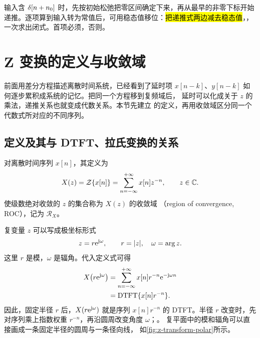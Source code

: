 \begin{technique}
  输入含 $\delta[n+n_0]$ 时，先按初始松弛把零区间确定下来，再从最早的非零下标开始递推。逐项算到输入转为常值后，可用稳态值移位：\hl{把递推式两边减去稳态值}，，一次求出闭式。首项必须，否则。
\end{technique}

\section{Z 变换的定义与收敛域}
\label{sec:z-transform-definition}

前面用差分方程描述离散时间系统，已经看到了延时项
$x[n-k]$、$y[n-k]$ 如何逐步累积成系统的记忆。把同一个方程移到复频域后，
延时可以化成关于 $z$ 的乘法，递推关系也就变成代数关系。本节先建立
的定义，再用收敛域区分同一个代数式所对应的不同序列。

\subsection{定义及其与 DTFT、拉氏变换的关系}
\label{subsec:z-transform-definition}

\begin{definition}[双边 Z 变换]
  对离散时间序列 $x[n]$，其定义为
  \begin{equation}
    X(z)=\mathcal{Z}\{x[n]\}
    =\sum_{n=-\infty}^{+\infty}x[n]z^{-n},
    \qquad z\in\mathbb{C}.
    \label{eq:z-transform-definition}
  \end{equation}
  使级数绝对收敛的 $z$ 的集合称为 $X(z)$ 的收敛域
  （region of convergence, ROC），记为 $\mathcal R_X$。
\end{definition}

复变量 $z$ 可以写成极坐标形式
\begin{equation}
  z=r\mathrm{e}^{\mathrm{j}\omega},
  \qquad r=|z|,\quad \omega=\arg z.
  \label{eq:z-transform-polar}
\end{equation}
这里 $r$ 是模，$\omega$ 是辐角。代入定义式可得
\begin{align}
  X\bigl(r\mathrm{e}^{\mathrm{j}\omega}\bigr)
  &=\sum_{n=-\infty}^{+\infty}
    x[n]r^{-n}\mathrm{e}^{-\mathrm{j}\omega n} \notag\\
  &=\operatorname{DTFT}\{x[n]r^{-n}\}.
  \label{eq:z-transform-dtft-link}
\end{align}
因此，固定半径 $r$ 后，$X(r\mathrm{e}^{\mathrm{j}\omega})$ 就是序列
$x[n]r^{-n}$ 的 DTFT。半径 $r$ 改变时，先对序列乘上指数权重
$r^{-n}$，再沿圆周改变角度 $\omega$；。
复平面中的模和辐角可以直接画成一条固定半径的圆周与一条径向线，
如\cref{fig:z-transform-polar}所示。

